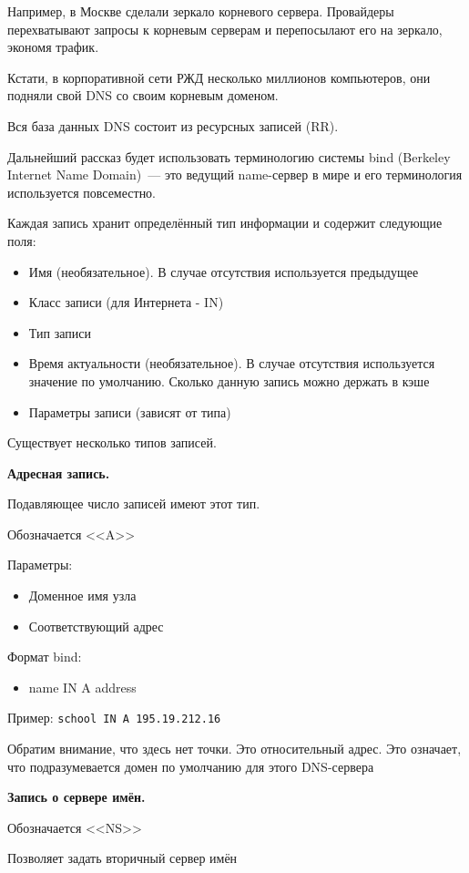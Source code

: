 Например, в Москве сделали зеркало корневого сервера. Провайдеры перехватывают запросы к корневым серверам и перепосылают его на зеркало, экономя трафик.

Кстати, в корпоративной сети РЖД несколько миллионов компьютеров, они подняли свой DNS со своим корневым доменом.

Вся база данных DNS состоит из ресурсных записей (RR).

Дальнейший рассказ будет использовать терминологию системы bind (Berkeley Internet Name Domain)~--- это ведущий name-сервер в мире и его терминология используется повсеместно.

Каждая запись хранит определённый тип информации и содержит следующие поля:
\begin{itemize}
    \item Имя (необязательное). В случае отсутствия используется предыдущее
    \item Класс записи (для Интернета - IN)
    \item Тип записи
    \item Время актуальности (необязательное). В случае отсутствия используется значение по умолчанию. Сколько данную запись можно держать в кэше
    \item Параметры записи (зависят от типа)
\end{itemize}

Существует несколько типов записей.

{\bf Адресная запись.}

Подавляющее число записей имеют этот тип.

Обозначается <<A>>

Параметры:
\begin{itemize}
    \item Доменное имя узла
    \item Соответствующий адрес
\end{itemize}
Формат bind:
\begin{itemize}
    \item name IN A address
\end{itemize}
Пример: {\tt school IN A 195.19.212.16}

Обратим внимание, что здесь нет точки. Это относительный адрес. Это означает, что подразумевается домен по умолчанию для этого DNS-сервера

{\bf Запись о сервере имён.}

Обозначается <<NS>>

Позволяет задать вторичный сервер имён

